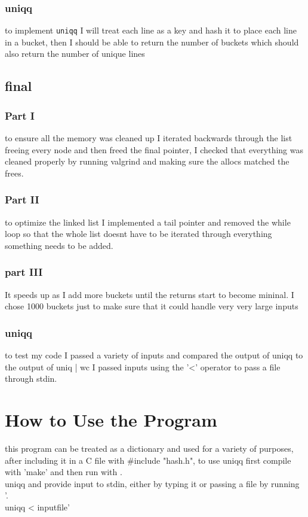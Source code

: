 \documentclass{article}
\begin{document}
\subsubsection*{uniqq}
to implement \lstinline{uniqq} I will treat each line as a key and hash it to place each line in a bucket, then I should be able to return the number of buckets which should also return the number of unique lines
\subsection*{final}
\subsubsection*{Part I}
to ensure all the memory was cleaned up I iterated backwards through the list freeing every node and then freed the final pointer, I checked that everything was cleaned properly by running valgrind and making sure the allocs matched the frees.
\subsubsection*{Part II}
to optimize the linked list I implemented a tail pointer and removed the while loop so that the whole list doesnt have to be iterated through everything something needs to be added.
\subsubsection*{part III}
It speeds up as I add more buckets until the returns start to become mininal. I chose 1000 buckets just to make sure that it could handle very very large inputs
\subsubsection{uniqq}
to test my code I passed a variety of inputs and compared the output of uniqq to the output of uniq | wc I passed inputs using the '<' operator to pass a file through stdin. 

\section*{How to Use the Program}

this program can be treated as a dictionary and used for a variety of purposes, after including it in a C file with #include "hash.h", to use uniqq first compile with 'make' and then run with .\\uniqq and provide input to stdin, either by typing it or passing a file by running '.\\uniqq < inputfile' 
\end{document}
